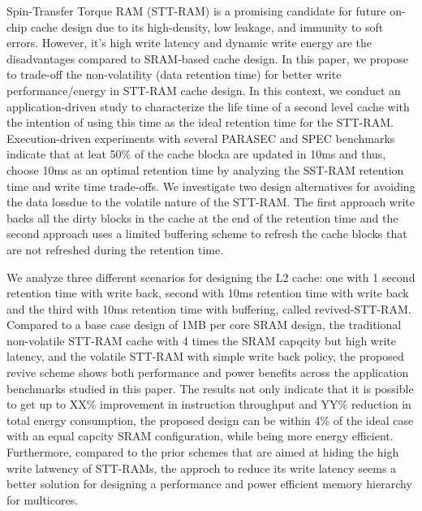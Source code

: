 Spin-Transfer Torque RAM (STT-RAM) is a promising candidate for future  
on-chip cache design due to its high-density, low leakage, and immunity to 
soft errors.  However, it's high write latency and dynamic
write energy are the disadvantages compared to SRAM-based cache design.
In this paper, we propose to trade-off the non-volatility (data retention time)
for better write performance/energy in STT-RAM cache design.
In this context, we conduct an application-driven study to characterize the
life time of a second level cache with the intention of using this time as the ideal
retention time for the STT-RAM. Execution-driven experiments with several PARASEC and SPEC benchmarks 
indicate that at leat 50\% of the cache blocka are updated in 10ms and thus, choose 10ms
as an optimal retention time by analyzing the SST-RAM retention time and write time trade-offs.
We investigate two design alternatives for avoiding the data lossdue to the volatile nature of the
STT-RAM. The first approach write backs all the dirty blocks in the cache at the end of the retention time
and the second approach uses a limited buffering scheme to refresh the cache blocks that are not refreshed 
during the retention time.

We analyze three different scenarios for designing the L2 cache: one with 1 second retention time with write back, 
second with 10ms retention time with write back and the third with 10ms retention time with buffering, called 
revived-STT-RAM. Compared to a base case design of 1MB per core SRAM design, the traditional non-volatile STT-RAM 
cache with 4 times the SRAM capqcity but high write latency, and the volatile STT-RAM with simple write back policy,
the proposed revive scheme shows both performance and power benefits across the application benchmarks studied in
this paper. The results not only indicate that it is possible to get up to XX\% improvement in instruction
throughput and YY\% reduction in total energy consumption, the proposed design can be within 4\% of the ideal case
with an equal capcity SRAM configuration, while being more energy efficient.
Furthermore, compared to the prior schemes that are aimed at hiding the high write latwency of STT-RAMs,
the approch to reduce its write latency seems a better solution for designing a performance and power efficient
memory hierarchy for multicores.
